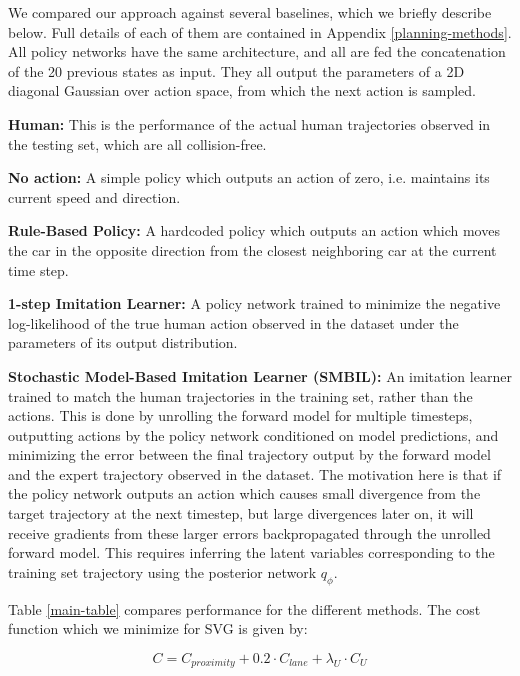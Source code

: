 \documentclass{article} %
\begin{document}
    We compared our approach against several baselines, which we briefly describe below. Full details of each of them are contained in Appendix \ref{planning-methods}.
    All policy networks have the same architecture, and all are fed the concatenation of the 20 previous states as input. They all output the parameters of a 2D diagonal Gaussian over action space, from which the next action is sampled.

    \textbf{Human:} This is the performance of the actual human trajectories observed in the testing set, which are all collision-free.

    \textbf{No action:} A simple policy which outputs an action of zero, i.e. maintains its current speed and direction.

    \textbf{Rule-Based Policy:} A hardcoded policy which outputs an action which moves the car in the opposite direction from the closest neighboring car at the current time step.

    \textbf{1-step Imitation Learner:} A policy network trained to minimize the negative log-likelihood of the true human action observed in the dataset under the parameters of its output distribution.

    \textbf{Stochastic Model-Based Imitation Learner (SMBIL):} An imitation learner trained to match the human trajectories in the training set, rather than the actions.
  This is done by unrolling the forward model for multiple timesteps, outputting actions by the policy network conditioned on model predictions, and minimizing the error between the final trajectory output by the forward model and the expert trajectory observed in the dataset.
  The motivation here is that if the policy network outputs an action which causes small divergence from the target trajectory at the next timestep, but large divergences later on, it will receive gradients from these larger errors backpropagated through the unrolled forward model. This requires inferring the latent variables corresponding to the training set trajectory using the posterior network $q_\phi$.





    Table \ref{main-table} compares performance for the different methods.
    The cost function which we minimize for SVG is given by:

    \begin{equation}
      C = C_{proximity} + 0.2 \cdot C_{lane} + \lambda_U \cdot C_U
    \end{equation}
\end{document}
